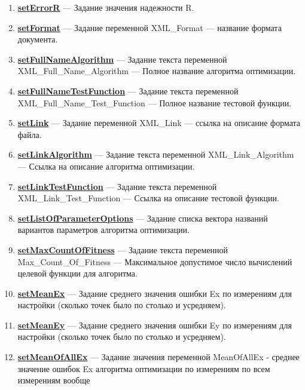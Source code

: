 \documentclass[a4paper,12pt]{article}
\begin{document}
\begin{enumerate}
	\item \textbf{\hyperref[setErrorR]{setErrorR}} --- Задание значения надежности R.
	
	\item \textbf{\hyperref[setFormat]{setFormat}} --- Задание переменной XML\_Format --- название формата документа.
	
	\item \textbf{\hyperref[setFullNameAlgorithm]{setFullNameAlgorithm}} --- Задание текста переменной  XML\_Full\_Name\_Algorithm --- Полное название алгоритма оптимизации.
	
	\item \textbf{\hyperref[setFullNameTestFunction]{setFullNameTestFunction}} --- Задание текста переменной  XML\_Full\_Name\_Test\_Function --- Полное название тестовой функции.
	
	\item \textbf{\hyperref[setLink]{setLink}} --- Задание переменной XML\_Link --- ссылка на описание формата файла.
	
	\item \textbf{\hyperref[setLinkAlgorithm]{setLinkAlgorithm}} --- Задание текста переменной  XML\_Link\_Algorithm --- Ссылка на описание алгоритма оптимизации.
	
	\item \textbf{\hyperref[setLinkTestFunction]{setLinkTestFunction}} --- Задание текста переменной  XML\_Link\_Test\_Function --- Ссылка на описание тестовой функции.
	
	\item \textbf{\hyperref[setListOfParameterOptions]{setListOfParameterOptions}} --- Задание списка вектора названий вариантов параметров алгоритма оптимизации.
	
	\item \textbf{\hyperref[setMaxCountOfFitness]{setMaxCountOfFitness}} --- Задание текста переменной  Max\_Count\_Of\_Fitness --- Максимальное допустимое число вычислений целевой функции для алгоритма.
	
	\item \textbf{\hyperref[setMeanEx]{setMeanEx}} --- Задание среднего значения ошибки Ex по измерениям для настройки (сколько точек было по столько и усредняем).
	
	\item \textbf{\hyperref[setMeanEy]{setMeanEy}} --- Задание среднего значения ошибки Ey по измерениям для настройки (сколько точек было по столько и усредняем).
	
	\item \textbf{\hyperref[setMeanOfAllEx]{setMeanOfAllEx}} --- Задание значения переменной MeanOfAllEx - среднее значение ошибок Ex алгоритма оптимизации по измерениям по всем измерениям вообще
	

\end{enumerate}
\end{document}
